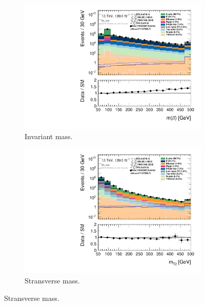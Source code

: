 \begin{figure}[H]
\begin{subfigure}[t!]{0.49\textwidth}
        \includegraphics[width=\textwidth]{Figures/ML_cuts/hist1d_mll_ML_cuts.pdf}
    \caption{Invariant mass.}
    \label{fig:my_label}
    \end{subfigure}
    \begin{subfigure}[t!]{0.49\textwidth}
        \includegraphics[width=\textwidth]{Figures/ML_cuts/hist1d_mt2_ML_cuts.pdf}
    \caption{Stransverse mass.}
    \label{fig:my_label}
    \end{subfigure}
\end{figure}

